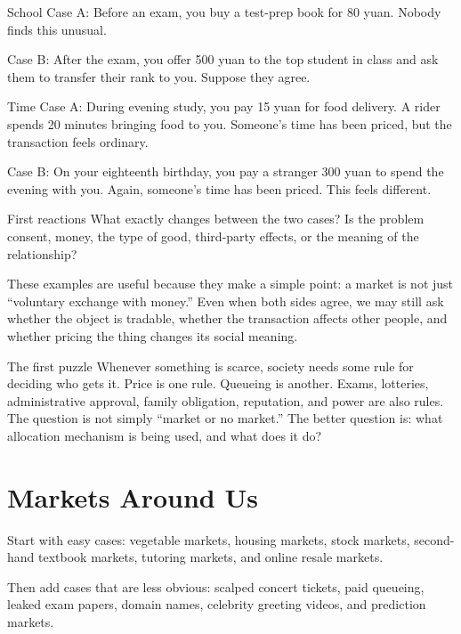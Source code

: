 \documentclass[10pt,a4paper]{article}
\begin{document}
\begin{examplebox}{School}
Case A: Before an exam, you buy a test-prep book for 80 yuan. Nobody finds this unusual.

Case B: After the exam, you offer 500 yuan to the top student in class and ask them to transfer their rank to you. Suppose they agree.
\end{examplebox}

\begin{examplebox}{Time}
Case A: During evening study, you pay 15 yuan for food delivery. A rider spends 20 minutes bringing food to you. Someone's time has been priced, but the transaction feels ordinary.

Case B: On your eighteenth birthday, you pay a stranger 300 yuan to spend the evening with you. Again, someone's time has been priced. This feels different.
\end{examplebox}

\begin{discussionbox}{First reactions}
What exactly changes between the two cases? Is the problem consent, money, the type of good, third-party effects, or the meaning of the relationship?
\end{discussionbox}

These examples are useful because they make a simple point: a market is not just ``voluntary exchange with money.'' Even when both sides agree, we may still ask whether the object is tradable, whether the transaction affects other people, and whether pricing the thing changes its social meaning.

\begin{insightbox}{The first puzzle}
Whenever something is scarce, society needs some rule for deciding who gets it. Price is one rule. Queueing is another. Exams, lotteries, administrative approval, family obligation, reputation, and power are also rules. The question is not simply ``market or no market.'' The better question is: what allocation mechanism is being used, and what does it do?
\end{insightbox}

\section{Markets Around Us}

Start with easy cases: vegetable markets, housing markets, stock markets, second-hand textbook markets, tutoring markets, and online resale markets.

Then add cases that are less obvious: scalped concert tickets, paid queueing, leaked exam papers, domain names, celebrity greeting videos, and prediction markets.
\end{document}
